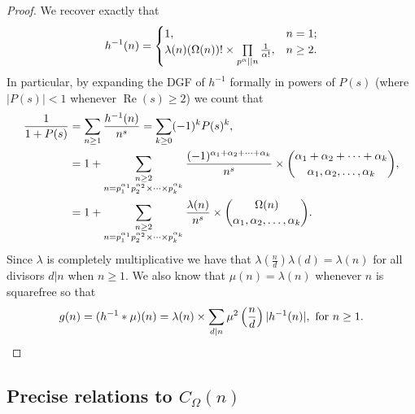 \documentclass[11pt,reqno,a4letter]{article}
\numberwithin{equation}{section}
\numberwithin{figure}{section}
\numberwithin{table}{section}
\newcommand{\cf}{\textit{cf.\ }}
\theoremstyle{plain}
\numberwithin{theorem}{section}
\theoremstyle{definition}
\renewcommand{\Re}{\operatorname{Re}}
\begin{document}
\begin{proof}
We recover exactly that \cite[\cf \S 2]{FROBERG-1968} 
\begin{equation} 
\notag 
h^{-1}(n) = \begin{cases} 
     1, & n = 1; \\ 
     \lambda(n) (\Omega(n))! \times \prod\limits_{p^{\alpha} || n} \frac{1}{\alpha!}, & n \geq 2. 
     \end{cases}
\end{equation} 
In particular, by expanding the DGF of 
$h^{-1}$ formally in powers of $P(s)$ (where $|P(s)| < 1$ whenever $\Re(s) \geq 2$) 
we count that 
\begin{align}
\notag
\frac{1}{1+P(s)} & = \sum_{n \geq 1} \frac{h^{-1}(n)}{n^s} = \sum_{k \geq 0} (-1)^k P(s)^k, \\ 
\notag
     & = 
     1 + \sum_{\substack{n \geq 2 \\ n =p_1^{\alpha_1}p_2^{\alpha_2} \times \cdots \times p_k^{\alpha_k}}} 
     \frac{(-1)^{\alpha_1+\alpha_2+\cdots+\alpha_k}}{n^s} \times 
     \binom{\alpha_1+\alpha_2+\cdots+\alpha_k}{\alpha_1,\alpha_2,\ldots,\alpha_k}, \\ 
\label{eqn_COmeganMultinomExp_as_DGFSeries_v2}
     & = 
     1 + \sum_{\substack{n \geq 2 \\ n =p_1^{\alpha_1}p_2^{\alpha_2} \times \cdots \times p_k^{\alpha_k}}} 
     \frac{\lambda(n)}{n^s} \times \binom{\Omega(n)}{\alpha_1,\alpha_2,\ldots,\alpha_k}. 
\end{align}
Since $\lambda$ is completely multiplicative we have that 
$\lambda\left(\frac{n}{d}\right) \lambda(d) = \lambda(n)$ for all divisors 
$d|n$ when $n \geq 1$. We also know that $\mu(n) = \lambda(n)$ whenever $n$ is squarefree so that
\[
g(n) = (h^{-1} \ast \mu)(n) = \lambda(n) \times 
     \sum_{d|n} \mu^2\left(\frac{n}{d}\right) |h^{-1}(n)|, \text{ for } n \geq 1. 
     \qedhere 
\]
\end{proof} 

\subsection{Precise relations to $C_{\Omega}(n)$} 
\label{Section_InvFunc_PreciseExpsAndAsymptotics} 
\label{subSection_Relating_CknFuncs_to_gInvn} 
\end{document}
